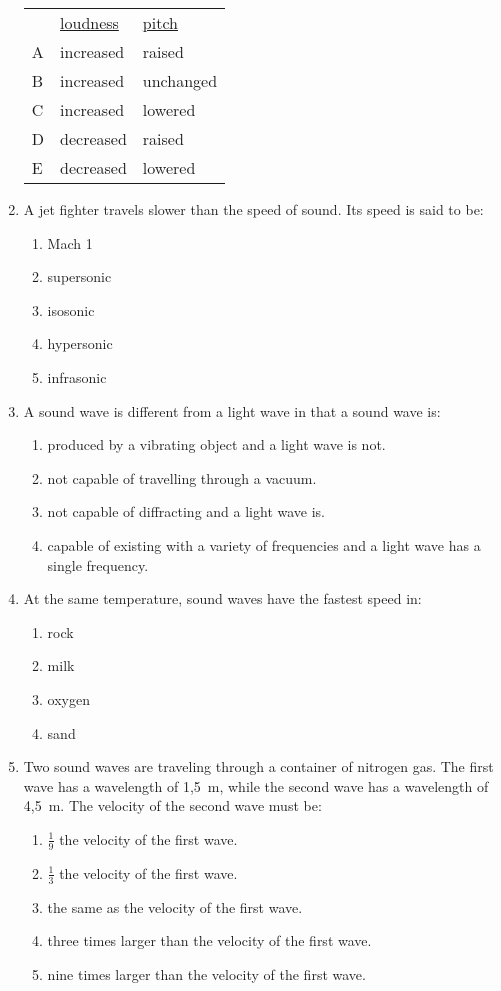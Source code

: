 \begin{enumerate}
\begin{tabular}{lll}
& \underline{loudness} & \underline{pitch}\\
A & increased & raised\\
B & increased & unchanged\\
C & increased & lowered\\
D & decreased & raised\\
E & decreased & lowered\\
\end{tabular}

\item A jet fighter travels slower than the speed of sound. Its speed is said to be:
\begin{enumerate}
\item Mach 1
\item supersonic
\item isosonic
\item hypersonic
\item infrasonic
\end{enumerate}

\item A sound wave is different from a light wave in that a sound wave is:
\begin{enumerate}
\item produced by a vibrating object and a light wave is not.
\item not capable of travelling through a vacuum.
\item not capable of diffracting and a light wave is.
\item capable of existing with a variety of frequencies and a light wave has a single frequency.
\end{enumerate}

\item At the same temperature, sound waves have the fastest speed in:
\begin{enumerate}
\item{rock}
\item{milk}
\item{oxygen}
\item{sand}
\end{enumerate}

\item Two sound waves are traveling through a container of nitrogen gas. The first wave has a wavelength of 1,5~m, while the second wave has a wavelength of 4,5~m. The velocity of the second wave must be:
\begin{enumerate}
\item{$\frac{1}{9}$ the velocity of the first wave.}
\item{$\frac{1}{3}$ the velocity of the first wave.}
\item{the same as the velocity of the first wave.}
\item{three times larger than the velocity of the first wave.}
\item{nine times larger than the velocity of the first wave.}
\end{enumerate}


\end{enumerate}
